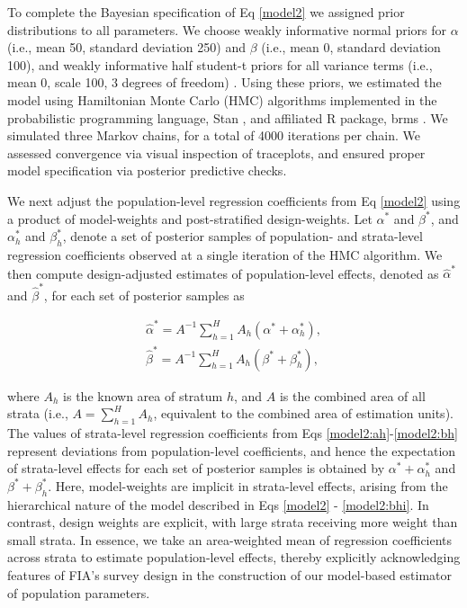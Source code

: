 \documentclass[11pt]{article}
\begin{document}
To complete the Bayesian specification of Eq \ref{model2} we assigned prior distributions to all parameters.  We choose weakly informative normal priors for $\alpha$ (i.e., mean 50, standard deviation 250) and $\beta$ (i.e., mean 0, standard deviation 100), and weakly informative half student-t priors for all variance terms (i.e., mean 0, scale 100, 3 degrees of freedom) \citep{gelman2006prior}. Using these priors, we estimated the model using Hamiltonian Monte Carlo (HMC) algorithms implemented in the probabilistic programming language, Stan \citep{carpenter2017stan}, and affiliated R package, brms \citep{burkner2017brms}. We simulated three Markov chains, for a total of 4000 iterations per chain. We assessed convergence via visual inspection of traceplots, and ensured proper model specification via posterior predictive checks. 

We next adjust the population-level regression coefficients from Eq \ref{model2} using a product of model-weights and post-stratified design-weights. Let $\alpha^{*}$ and $\beta^{*}$, and $\alpha_{h}^{*}$ and $\beta_{h}^{*}$, denote a set of posterior samples of population- and strata-level regression coefficients observed at a single iteration of the HMC algorithm. We then compute design-adjusted estimates of population-level effects, denoted as $\hat{\alpha}^{*}$ and $\hat{\beta}^{*}$, for each set of posterior samples as
\begin{linenomath*}
\begin{align}
    \hat{\alpha}^{*} = A^{-1} \sum_{h=1}^{H} A_h (\alpha^{*} + \alpha_{h}^{*}), \label{model2:a} \\
    \hat{\beta}^{*} =  A^{-1} \sum_{h=1}^{H} A_h (\beta^{*} + \beta_{h}^{*}), \label{model2:b}
\end{align}
\end{linenomath*}
where $A_h$ is the known area of stratum $h$, and $A$ is the combined area of all strata (i.e., $A=\sum_{h=1}^H A_h$, equivalent to the combined area of estimation units). 
The values of strata-level regression coefficients from Eqs \ref{model2:ah}-\ref{model2:bh} represent deviations from population-level coefficients, and hence the expectation of strata-level effects for each set of posterior samples is obtained by $\alpha^{*} + \alpha_{h}^{*}$ and $\beta^{*} + \beta_{h}^{*}$. Here, model-weights are implicit in strata-level effects, arising from the hierarchical nature of the model described in Eqs \ref{model2} - \ref{model2:bhi}. In contrast, design weights are explicit, with large strata receiving more weight than small strata. In essence, we take an area-weighted mean of regression coefficients across strata to estimate population-level effects, thereby explicitly acknowledging features of FIA's survey design in the construction of our model-based estimator of population parameters. 
\end{document}
